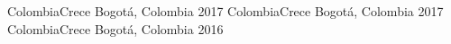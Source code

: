 

\begin{cventries}
  \vspace{-0.9cm}
  \cventry{}{}{}{}{}
  {ColombiaCrece} %
  {Bogotá, Colombia} %
  {2017}{}
  {ColombiaCrece} %
  {Bogotá, Colombia} %
  {2017}{}
  {ColombiaCrece} %
  {Bogotá, Colombia} %
  {2016}{}
  \vspace{-0.3cm}
\end{cventries}
